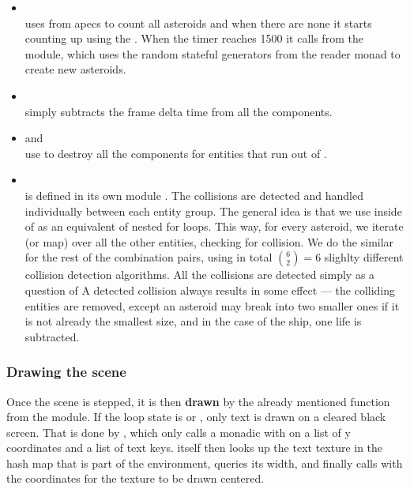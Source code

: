 \documentclass[
  digital, %
  color,   %
  table,   %
  oneside, %
  lof,     %
  lot,     %
]{fithesis3}
\begin{document}
\begin{itemize}[\textendash]
    \item {}\\
    uses  from apecs to count all asteroids and
    when there are none it starts counting up using the .
    When the timer reaches 1500 it calls 
    from the  module, which uses the random stateful
    generators from the  reader monad to create new asteroids.

    \item {}\\
    simply subtracts the frame delta time  from all the
     components.

    \item {} and \\
    use  to destroy all the components for entities that run out of .

    \item {}\\
    is defined in its own module .
    The collisions are detected and handled individually between each
    entity group. The general idea is that we use  inside of 
    as an equivalent of nested for loops. This way, for every asteroid,
    we iterate (or map) over all the other entities, checking for collision.
    We do the similar for the rest of the combination pairs,
    using in total $\binom{6}{2} = 6$ slighlty different collision detection algorithms.
    All the collisions are detected
    simply as a question of  A detected collision always results in some effect
    --- the colliding entities are removed, except an asteroid may break into two
    smaller ones if it is not already the smallest size, and
    in the case of the ship, one life is subtracted.
\end{itemize}

\subsubsection{\textbf{Drawing the scene}}
Once the scene is stepped, it is then \textbf{drawn} by the already mentioned 
function from the  module. If the loop state is  or
, only text is drawn on a cleared black screen. That is done by
, which only calls a monadic  with
 on a list of y coordinates and a list of text keys.
 itself then looks up the text texture in the
hash map that is part of the  environment,
queries its width, and finally calls  with the coordinates
for the texture to be drawn centered.
\end{document}
